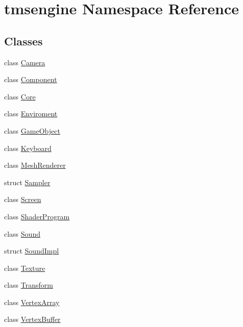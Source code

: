 \hypertarget{namespacetmsengine}{}\section{tmsengine Namespace Reference}
\label{namespacetmsengine}
\subsection*{Classes}
\begin{DoxyCompactItemize}
\item 
class \hyperlink{classtmsengine_1_1_camera}{Camera}
\item 
class \hyperlink{classtmsengine_1_1_component}{Component}
\item 
class \hyperlink{classtmsengine_1_1_core}{Core}
\item 
class \hyperlink{classtmsengine_1_1_enviroment}{Enviroment}
\item 
class \hyperlink{classtmsengine_1_1_game_object}{Game\+Object}
\item 
class \hyperlink{classtmsengine_1_1_keyboard}{Keyboard}
\item 
class \hyperlink{classtmsengine_1_1_mesh_renderer}{Mesh\+Renderer}
\item 
struct \hyperlink{structtmsengine_1_1_sampler}{Sampler}
\item 
class \hyperlink{classtmsengine_1_1_screen}{Screen}
\item 
class \hyperlink{classtmsengine_1_1_shader_program}{Shader\+Program}
\item 
class \hyperlink{classtmsengine_1_1_sound}{Sound}
\item 
struct \hyperlink{structtmsengine_1_1_sound_impl}{Sound\+Impl}
\item 
class \hyperlink{classtmsengine_1_1_texture}{Texture}
\item 
class \hyperlink{classtmsengine_1_1_transform}{Transform}
\item 
class \hyperlink{classtmsengine_1_1_vertex_array}{Vertex\+Array}
\item 
class \hyperlink{classtmsengine_1_1_vertex_buffer}{Vertex\+Buffer}
\end{DoxyCompactItemize}
